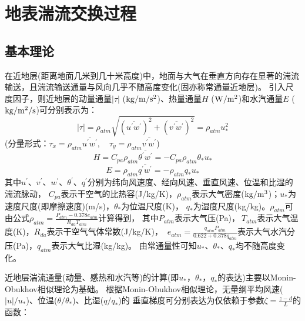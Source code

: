 \chapter{地表湍流交换过程}

\section{基本理论}\label{基本理论}
在近地层(距离地面几米到几十米高度)中，地面与大气在垂直方向存在显著的湍流输送，且湍流输送通量与风向几乎不随高度变化(固亦称常通量近地层)。
引入尺度因子，则近地层的动量通量$\left|\tau\right|$ ($\rm kg/m/s^2$)、热量通量$H$ ($\rm W/m^2$)和水汽通量$E$ ($\rm kg/m^2/s$)可分别表示为：
\begin{equation}
|\tau|=\rho_{atm} \sqrt{ \left(\overline{u^{\prime} w^{\prime}}\right)^{2} + \left(\overline{v^{\prime} w^{\prime}}\right)^{2} }=\rho_{atm} u_{*}^{2}
\end{equation}
(分量形式：$\tau_{x}=\rho_{atm} \overline{u^{\prime} w^{\prime}}, \quad \tau_{y}=\rho_{atm} \overline{v^{\prime} w^{\prime}}$)
\begin{equation}
H=C_{p a} \rho_{atm} \overline{\theta^{\prime} w^{\prime}}=-C_{p a} \rho_{atm} \theta_{*} u_{*}
\end{equation}
\begin{equation}
E=\rho_{atm} \overline{q^{\prime} w^{\prime}}=-\rho_{atm} q_{*} u_{*}
\end{equation}
其中$u^\prime$、$v^\prime$、$w^\prime$、$\theta^\prime$、$q^\prime$分别为纬向风速度、经向风速、垂直风速、位温和比湿的湍流脉动，
$C_{pa}$表示干空气的比热容(J/kg/K)，$\rho_{atm}$表示大气密度($\rm kg/m^3$)；$u_\ast$为速度尺度(即摩擦速度)(m/s)，$\theta_\ast$为位温尺度(K)，
$q_\ast$为湿度尺度(kg/kg)。$\rho_{atm}$可由公式$\rho_{atm}=\frac{P_{atm}-0.378e_{atm}}{R_{da}T_{atm}}$计算得到，
其中$P_{atm}$表示大气压(Pa)，$\ T_{atm}$表示大气温度(K)，$R_{da}$表示干空气气体常数(J/kg/K)，
$\ e_{atm}=\frac{q_{atm}P_{atm}}{0.622+0.378q_{atm}}$表示大气水汽分压(Pa)，$q_{atm}$表示大气比湿(kg/kg)。
由常通量性可知$u_\ast$、$\theta_\ast$、$q_\ast$均不随高度变化。


近地层湍流通量(动量、感热和水汽等)的计算(即$u_\ast$，$\theta_\ast$，$q_\ast$的表达)主要以Monin-Obukhov相似理论为基础。
根据Monin-Obukhov相似理论，无量纲平均风速($\left|u\right|/u_\ast$)、位温($\theta/\theta_\ast$)、比湿($q/q_\ast$)的
垂直梯度可分别表达为仅依赖于参数$\zeta=\frac{z-d}{L}$的函数：


